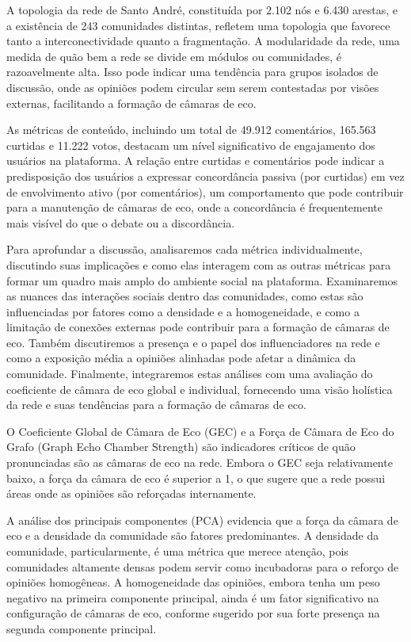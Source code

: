 A topologia da rede de Santo André, constituída por 2.102 nós e 6.430 arestas, e a existência de 243 comunidades distintas, refletem uma topologia que favorece tanto a interconectividade quanto a fragmentação. A modularidade da rede, uma medida de quão bem a rede se divide em módulos ou comunidades, é razoavelmente alta. Isso pode indicar uma tendência para grupos isolados de discussão, onde as opiniões podem circular sem serem contestadas por visões externas, facilitando a formação de câmaras de eco.

As métricas de conteúdo, incluindo um total de 49.912 comentários, 165.563 curtidas e 11.222 votos, destacam um nível significativo de engajamento dos usuários na plataforma. A relação entre curtidas e comentários pode indicar a predisposição dos usuários a expressar concordância passiva (por curtidas) em vez de envolvimento ativo (por comentários), um comportamento que pode contribuir para a manutenção de câmaras de eco, onde a concordância é frequentemente mais visível do que o debate ou a discordância.

Para aprofundar a discussão, analisaremos cada métrica individualmente, discutindo suas implicações e como elas interagem com as outras métricas para formar um quadro mais amplo do ambiente social na plataforma. Examinaremos as nuances das interações sociais dentro das comunidades, como estas são influenciadas por fatores como a densidade e a homogeneidade, e como a limitação de conexões externas pode contribuir para a formação de câmaras de eco. Também discutiremos a presença e o papel dos influenciadores na rede e como a exposição média a opiniões alinhadas pode afetar a dinâmica da comunidade. Finalmente, integraremos estas análises com uma avaliação do coeficiente de câmara de eco global e individual, fornecendo uma visão holística da rede e suas tendências para a formação de câmaras de eco.

O Coeficiente Global de Câmara de Eco (GEC) e a Força de Câmara de Eco do Grafo (Graph Echo Chamber Strength) são indicadores críticos de quão pronunciadas são as câmaras de eco na rede. Embora o GEC seja relativamente baixo, a força da câmara de eco é superior a 1, o que sugere que a rede possui áreas onde as opiniões são reforçadas internamente.

A análise dos principais componentes (PCA) evidencia que a força da câmara de eco e a densidade da comunidade são fatores predominantes. A densidade da comunidade, particularmente, é uma métrica que merece atenção, pois comunidades altamente densas podem servir como incubadoras para o reforço de opiniões homogêneas. A homogeneidade das opiniões, embora tenha um peso negativo na primeira componente principal, ainda é um fator significativo na configuração de câmaras de eco, conforme sugerido por sua forte presença na segunda componente principal.

